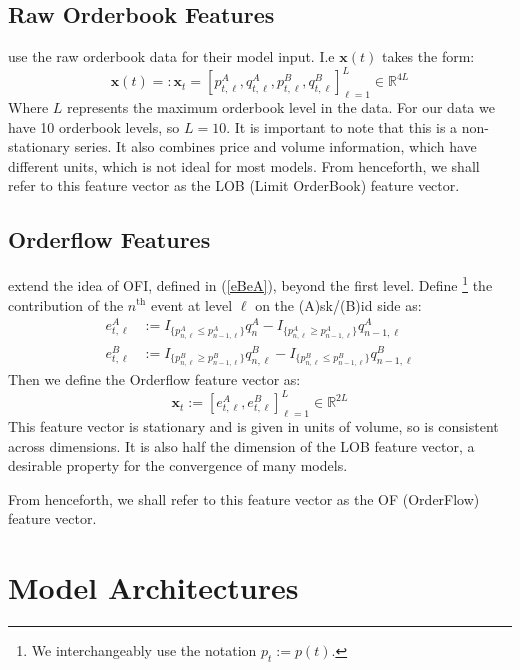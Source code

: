 \documentclass[a4paper, oneside, notitlepage]{book}
\begin{document}
\subsection{Raw Orderbook Features}
\cite{ZHANG2019} use the raw orderbook data for their model input. I.e $\bm{x}(t)$ takes the form:
\begin{equation}
    \bm{x}(t) =: \bm{x}_t = [p_{t, \ell}^A, q_{t, \ell}^A, p_{t, \ell}^B, q_{t, \ell}^B]_{\ell=1}^{L} \in \mathbb{R}^{4L}
    \label{LOB_feature_vector}
\end{equation}
Where $L$ represents the maximum orderbook level in the data. For our data we have 10 orderbook
levels, so $L=10$. It is important to note that this is a non-stationary series.
It also combines price and volume information, which have different units, which is not ideal for most models.
From henceforth, we shall refer to this feature vector as the LOB (Limit OrderBook) feature vector.


\subsection{Orderflow Features}
\cite{KOLM2023} extend the idea of OFI, defined in (\ref{eBeA}), beyond the first level.
Define \footnote{We interchangeably use the notation $p_t := p(t)$.} the contribution of
the $n^\text{th}$ event at level $\ell$ on the (A)sk/(B)id side as: 
\begin{align}
    e_{t,\ell}^{A} &:=  I_{\{ p_{n, \ell}^A \leq p_{n-1,\ell}^A \}} q_{n}^A - I_{\{ p_{n, \ell}^A \geq p_{n-1, \ell}^A \}} q_{n-1, \ell}^A \\
    e_{t, \ell}^{B} &:= I_{\{ p_{n, \ell}^B \geq p_{n-1, \ell}^B \}} q_{n, \ell}^B - I_{\{ p_{n, \ell}^B \leq p_{n-1, \ell}^B \}} q_{n-1, \ell}^B
\end{align}
Then we define the Orderflow feature vector as:
\begin{equation}
    \bm{x}_t := [e_{t, \ell}^{A}, e_{t, \ell}^{B}]_{\ell=1}^L \in \mathbb{R}^{2L} \label{OF_feature_vector}
\end{equation}
This feature vector is stationary and is given in units of volume, so is consistent across dimensions.
It is also half the dimension of the LOB feature vector, a desirable property for the convergence of many models.

From henceforth, we shall refer to this feature vector as the OF (OrderFlow) feature vector.




\section{Model Architectures}
\end{document}
